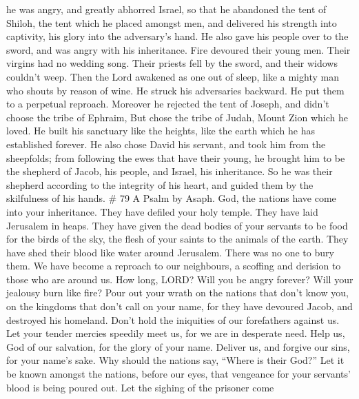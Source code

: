 he was angry, and greatly abhorred Israel,  so that he
abandoned the tent of Shiloh, the tent which he placed amongst men,
 and delivered his strength into captivity, his glory into
the adversary's hand.  He also gave his people over to the
sword, and was angry with his inheritance.  Fire devoured
their young men. Their virgins had no wedding song.  Their
priests fell by the sword, and their widows couldn't weep. 
Then the Lord awakened as one out of sleep, like a mighty man who shouts
by reason of wine.  He struck his adversaries backward. He
put them to a perpetual reproach.  Moreover he rejected the
tent of Joseph, and didn't choose the tribe of Ephraim, 
But chose the tribe of Judah, Mount Zion which he loved. 
He built his sanctuary like the heights, like the earth which he has
established forever.  He also chose David his servant, and
took him from the sheepfolds;  from following the ewes that
have their young, he brought him to be the shepherd of Jacob, his
people, and Israel, his inheritance.  So he was their
shepherd according to the integrity of his heart, and guided them by the
skilfulness of his hands. \# 79 A Psalm by Asaph.  God, the
nations have come into your inheritance. They have defiled your holy
temple. They have laid Jerusalem in heaps.  They have given
the dead bodies of your servants to be food for the birds of the sky,
the flesh of your saints to the animals of the earth.  They
have shed their blood like water around Jerusalem. There was no one to
bury them.  We have become a reproach to our neighbours, a
scoffing and derision to those who are around us.  How long,
LORD? Will you be angry forever? Will your jealousy burn like fire?
 Pour out your wrath on the nations that don't know you, on
the kingdoms that don't call on your name,  for they have
devoured Jacob, and destroyed his homeland.  Don't hold the
iniquities of our forefathers against us. Let your tender mercies
speedily meet us, for we are in desperate need.  Help us,
God of our salvation, for the glory of your name. Deliver us, and
forgive our sins, for your name's sake.  Why should the
nations say, ``Where is their God?'' Let it be known amongst the
nations, before our eyes, that vengeance for your servants' blood is
being poured out.  Let the sighing of the prisoner come
